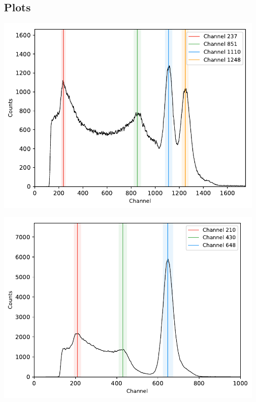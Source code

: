 \subsection{Plots}
%
\begin{multicols}{2}
%
\minipage{\linewidth}
    \begin{center}
        \captionsetup{type=figure}
        \begin{adjustbox}{max width=\linewidth, keepaspectratio}
            \includegraphics[]{pdf/60Co}
        \end{adjustbox}
        \label{fig:Spectrum60Co}
    \end{center}
\endminipage
%
\vspace{10mm}
%
\minipage{\linewidth}
    \begin{center}
        \captionsetup{type=figure}
        \begin{adjustbox}{max width=\linewidth, keepaspectratio}
            \includegraphics[]{pdf/137Cs}

\end{adjustbox}
\end{center}
\end{multicols}
